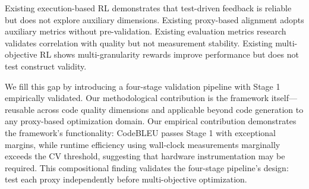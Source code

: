 Existing execution-based RL demonstrates that test-driven feedback is reliable but does not explore auxiliary dimensions. Existing proxy-based alignment adopts auxiliary metrics without pre-validation. Existing evaluation metrics research validates correlation with quality but not measurement stability. Existing multi-objective RL shows multi-granularity rewards improve performance but does not test construct validity.

We fill this gap by introducing a four-stage validation pipeline with Stage 1 empirically validated. Our methodological contribution is the framework itself---reusable across code quality dimensions and applicable beyond code generation to any proxy-based optimization domain. Our empirical contribution demonstrates the framework's functionality: CodeBLEU passes Stage 1 with exceptional margins, while runtime efficiency using wall-clock measurements marginally exceeds the CV threshold, suggesting that hardware instrumentation may be required. This compositional finding validates the four-stage pipeline's design: test each proxy independently before multi-objective optimization.
